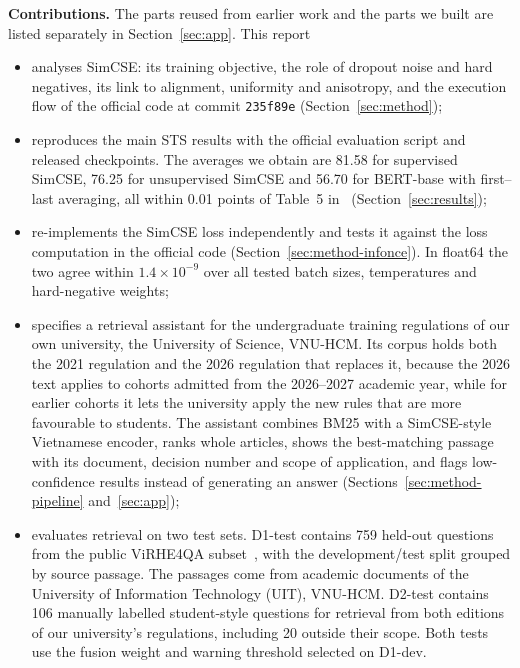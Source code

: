 \textbf{Contributions.} The parts reused from earlier work and the parts we
built are listed separately in Section~\ref{sec:app}. This report
\begin{itemize}
\item analyses SimCSE: its training objective, the role of dropout noise and
hard negatives, its link to alignment, uniformity and anisotropy, and the
execution flow of the official code at commit \texttt{235f89e}
(Section~\ref{sec:method});
\item reproduces the main STS results with the official evaluation script and
released checkpoints. The averages we obtain are 81.58 for supervised SimCSE,
76.25 for unsupervised SimCSE and 56.70 for BERT-base with first--last
averaging, all within 0.01 points of Table~5 in~\cite{gao-etal-2021-simcse}
(Section~\ref{sec:results});
\item re-implements the SimCSE loss independently and tests it against the loss
computation in the official code (Section~\ref{sec:method-infonce}).
In float64 the two agree within $1.4\times10^{-9}$ over all tested batch
sizes, temperatures and hard-negative weights;
\item specifies a retrieval assistant for the undergraduate training regulations of
our own university, the University of Science, VNU-HCM. Its corpus holds both
the 2021 regulation and the 2026 regulation that replaces it, because the 2026
text applies to cohorts admitted from the 2026--2027 academic year, while for
earlier cohorts it lets the university apply the new rules that are more
favourable to students. The assistant combines
BM25 with a SimCSE-style Vietnamese encoder, ranks whole articles, shows the
best-matching passage with its document, decision number and scope of
application, and flags low-confidence results instead of generating an answer
(Sections~\ref{sec:method-pipeline} and~\ref{sec:app});
\item evaluates retrieval on two test sets. D1-test contains 759 held-out
questions from the public ViRHE4QA
subset~\cite{do2024r2gqaretrieverreadergeneratorquestionanswering,nguyen-quan-2026-works},
with the development/test split grouped by source passage. The passages
come from academic documents of the University of Information Technology
(UIT), VNU-HCM.
D2-test contains 106 manually labelled student-style questions for retrieval
from both editions of our university's regulations, including 20 outside
their scope.
Both tests use the fusion weight and warning threshold selected on D1-dev.
\end{itemize}

